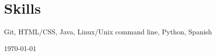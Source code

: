 \documentclass[12pt, a4paper]{article}
\begin{document}

\vspace{-8mm}
\section*{Skills}
\vspace{-2mm} Git, HTML/CSS, Java, Linux/Unix command line, Python, Spanish\\

\vspace{-6mm}
\begin{center}
{\scriptsize\today\- }
\end{center}
\end{document}
